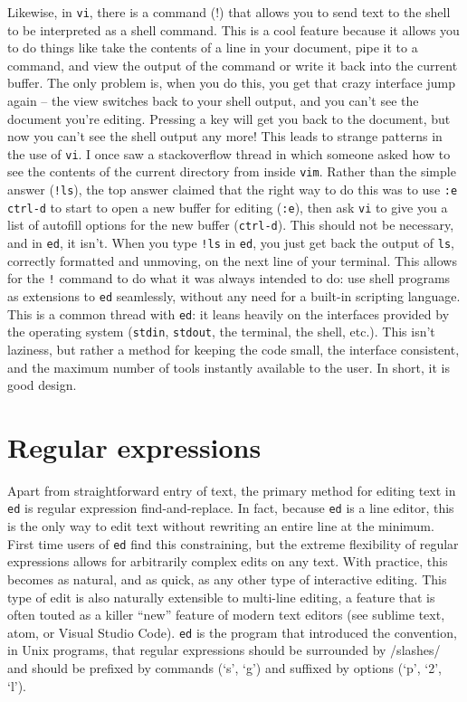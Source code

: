 \documentclass[12pt]{article}
\begin{document}
Likewise, in \lstinline{vi}, there is a command (!) that allows you
to send text to the shell to be interpreted as a shell command.
This is a cool feature because it allows you to do things like
take the contents of a line in your document, pipe it to a command,
and view the output of the command or write it back into the current buffer.
The only problem is, when you do this, you get that crazy interface jump
again -- the view switches back to your shell output, and you can't see
the document you're editing. Pressing a key will get you back to the document,
but now you can't see the shell output any more! This leads to strange
patterns in the use of \lstinline{vi}. I once saw a stackoverflow thread
in which someone asked how to see the contents of the current directory from
inside \lstinline{vim}. Rather than the simple answer (\lstinline{!ls}), the
top answer claimed that the right way to do this was to use \lstinline{:e ctrl-d}
to start to open a new buffer for editing (\lstinline{:e}), then ask \lstinline{vi}
to give you a list of autofill options for the new buffer (\lstinline{ctrl-d}).
This should not be necessary, and in \lstinline{ed}, it isn't. When you type
\lstinline{!ls} in \lstinline{ed}, you just get back 
the output of \lstinline{ls}, correctly formatted and unmoving, on the next
line of your terminal. This allows for the \lstinline{!} command to do what
it was always intended to do: use shell programs as extensions to \lstinline{ed}
seamlessly, without any need for a built-in scripting language.
This is a common thread with \lstinline{ed}: it leans heavily on the interfaces provided
by the operating system (\lstinline{stdin}, \lstinline{stdout}, the terminal, the shell, etc.).
This isn't laziness, but rather a method for keeping the code small, the interface consistent,
and the maximum number of tools instantly available to the user. In short, it is good design.

\section{Regular expressions}

Apart from straightforward entry of text, the primary method
for editing text in \lstinline{ed} is regular expression
find-and-replace. In fact, because \lstinline{ed} is a line editor,
this is the only way to edit text without rewriting an entire line
at the minimum. First time users of \lstinline{ed} find this
constraining, but the extreme flexibility of regular expressions
allows for arbitrarily complex edits on any text. With practice,
this becomes as natural, and as quick, as any other type of interactive
editing. This type of edit is also naturally extensible to multi-line
editing, a feature that is often touted as a killer ``new'' feature of
modern text editors (see sublime text, atom, or Visual Studio Code).
\lstinline{ed} is the program that introduced the convention,
in Unix programs, that regular expressions should be surrounded
by /slashes/ and should be prefixed by commands (`s', `g') and suffixed
by options (`p', `2', `l').
\end{document}
